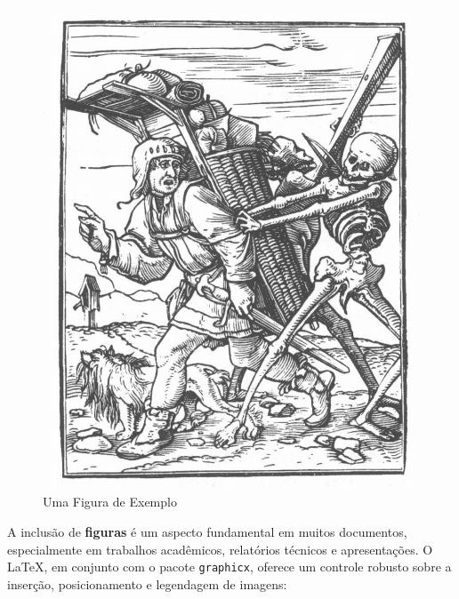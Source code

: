 \begin{figure}[htb!]
	\centering
	\caption{Uma Figura de Exemplo}\label{fig:exemplo} %
	\includegraphics[scale=0.3]{imgs/exemplo}
	
\end{figure}

A inclusão de \textbf{figuras} é um aspecto fundamental em muitos documentos, especialmente em trabalhos acadêmicos, relatórios técnicos e apresentações. O LaTeX, em conjunto com o pacote \texttt{graphicx}, oferece um controle robusto sobre a inserção, posicionamento e legendagem de imagens:

